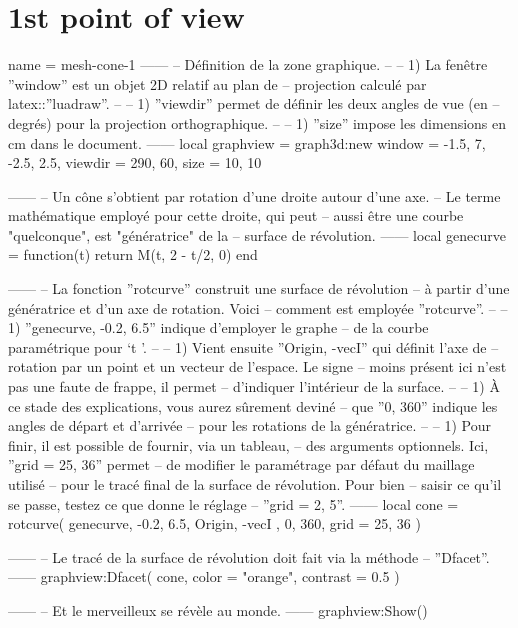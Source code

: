 \documentclass[varwidth, border = 3pt]{standalone}
\begin{document}
\section*{1st point of view}

\begin{luadraw}{name = mesh-cone-1}
------
-- Définition de la zone graphique.
--
--     1) La fenêtre ''window'' est un objet 2D relatif au plan de
--     projection calculé par latex::''luadraw''.
--
--     1) ''viewdir'' permet de définir les deux angles de vue (en
--     degrés) pour la projection orthographique.
--
--     1) ''size'' impose les dimensions en cm dans le document.
------
local graphview = graph3d:new{
  window  = {-1.5, 7, -2.5, 2.5},
  viewdir = {290, 60},
  size    = {10, 10}
}

------
-- Un cône s'obtient par rotation d'une droite autour d'une axe.
-- Le terme mathématique employé pour cette droite, qui peut
-- aussi être une courbe "quelconque", est "génératrice" de la
-- surface de révolution.
------
local genecurve = function(t)
  return M(t, 2 - t/2, 0)
end

------
-- La fonction ''rotcurve'' construit une surface de révolution
-- à partir d'une génératrice et d'un axe de rotation. Voici
-- comment est employée ''rotcurve''.
--
--     1) ''genecurve, -0.2, 6.5'' indique d'employer le graphe
--     de la courbe paramétrique pour `t \in [-0.2 .. 6.5]'.
--
--     1) Vient ensuite ''{Origin, -vecI}'' qui définit l'axe de
--     rotation par un point et un vecteur de l'espace. Le signe
--     moins présent ici n'est pas une faute de frappe, il permet
--     d'indiquer l'intérieur de la surface.
--
--     1) À ce stade des explications, vous aurez sûrement deviné
--     que ''0, 360'' indique les angles de départ et d'arrivée
--     pour les rotations de la génératrice.
--
--     1) Pour finir, il est possible de fournir, via un tableau,
--     des arguments optionnels. Ici, ''grid = {25, 36}'' permet
--     de modifier le paramétrage par défaut du maillage utilisé
--     pour le tracé final de la surface de révolution. Pour bien
--     saisir ce qu'il se passe, testez ce que donne le réglage
--     ''grid = {2, 5}''.
------
local cone = rotcurve(
  genecurve, -0.2, 6.5,
  {
    Origin, -vecI
  },
  0, 360,
  {
    grid = {25, 36}
  })

------
-- Le tracé de la surface de révolution doit fait via la méthode
-- ''Dfacet''.
------
graphview:Dfacet(
  cone,
  {
    color  = "orange",
    contrast = 0.5
  })

------
-- Et le merveilleux se révèle au monde.
------
graphview:Show()
\end{luadraw}
\end{document}
